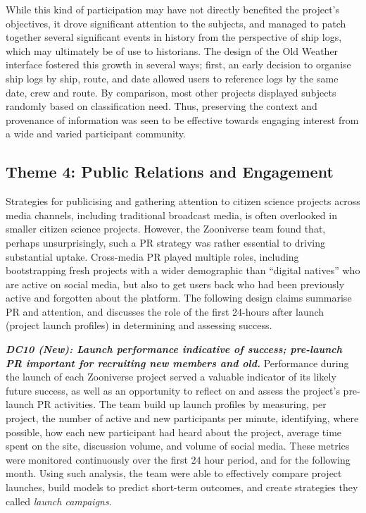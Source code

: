 \documentclass{sigchi}
\begin{document}
\begin{spacing}{0.97}
While this kind of participation may have not directly benefited the project's objectives, it drove significant attention to the subjects, and managed to patch together several significant events in history from the perspective of ship logs, which may ultimately be of use to historians. The design of the Old Weather interface fostered this growth in several ways; first, an early decision to organise ship logs by ship, route, and date allowed users to reference logs by the same date, crew and route. By comparison, most other projects displayed subjects randomly based on classification need. Thus, preserving the context and provenance of information was seen to be effective towards engaging interest from a wide and varied participant community.

\subsection{Theme 4: Public Relations and Engagement}

Strategies for publicising and gathering attention to citizen science projects across media channels, including traditional broadcast media, is often overlooked in smaller citizen science projects. However, the Zooniverse team found that, perhaps unsurprisingly, such a PR strategy was rather essential to driving substantial uptake. Cross-media PR played multiple roles, including bootstrapping fresh projects with a wider demographic than ``digital natives'' who are active on social media, but also to get users back who had been previously active and forgotten about the platform. The following design claims summarise PR and attention, and discusses the role of the first 24-hours after launch (project launch profiles) in determining and assessing success.

\textbf{\emph{DC10 (New): Launch performance indicative of success; pre-launch PR important for recruiting new members and old.}} Performance during the launch of each Zooniverse project served a valuable indicator of its likely future success, as well as an opportunity to reflect on and assess the project's pre-launch PR activities. The team build up launch profiles by measuring, per project, the number of active and new participants per minute, identifying, where possible, how each new participant had heard about the project, average time spent on the site, discussion volume, and volume of social media. These metrics were monitored continuously over the first 24 hour period, and for the following month. Using such analysis, the team were able to effectively compare project launches, build models to predict short-term outcomes, and create strategies they called \emph{launch campaigns}.


\end{spacing}
\end{document}
